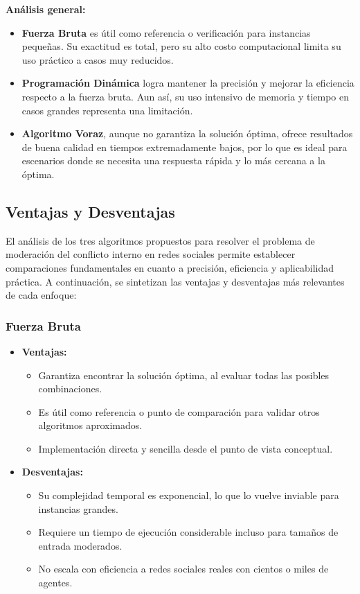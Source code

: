 \documentclass[11pt,letter]{article}
\begin{document}
    \textbf{Análisis general:}
    \begin{itemize}
        \item \textbf{Fuerza Bruta} es útil como referencia o verificación para instancias pequeñas. Su exactitud es total, pero su alto costo computacional limita su uso práctico a casos muy reducidos.
        \item \textbf{Programación Dinámica} logra mantener la precisión y mejorar la eficiencia respecto a la fuerza bruta. Aun así, su uso intensivo de memoria y tiempo en casos grandes representa una limitación.
        \item \textbf{Algoritmo Voraz}, aunque no garantiza la solución óptima, ofrece resultados de buena calidad en tiempos extremadamente bajos, por lo que es ideal para escenarios donde se necesita una respuesta rápida y lo más cercana a la óptima.
    \end{itemize}

    \subsection{Ventajas y Desventajas}

    El análisis de los tres algoritmos propuestos para resolver el problema de moderación del conflicto interno en redes sociales permite establecer comparaciones fundamentales en cuanto a precisión, eficiencia y aplicabilidad práctica. A continuación, se sintetizan las ventajas y desventajas más relevantes de cada enfoque:

    \subsubsection{Fuerza Bruta}

    \begin{itemize}
        \item \textbf{Ventajas:}
        \begin{itemize}
            \item Garantiza encontrar la solución óptima, al evaluar todas las posibles combinaciones.
            \item Es útil como referencia o punto de comparación para validar otros algoritmos aproximados.
            \item Implementación directa y sencilla desde el punto de vista conceptual.
        \end{itemize}
        \item \textbf{Desventajas:}
        \begin{itemize}
            \item Su complejidad temporal es exponencial, lo que lo vuelve inviable para instancias grandes.
            \item Requiere un tiempo de ejecución considerable incluso para tamaños de entrada moderados.
            \item No escala con eficiencia a redes sociales reales con cientos o miles de agentes.
        \end{itemize}
    \end{itemize}
\end{document}
